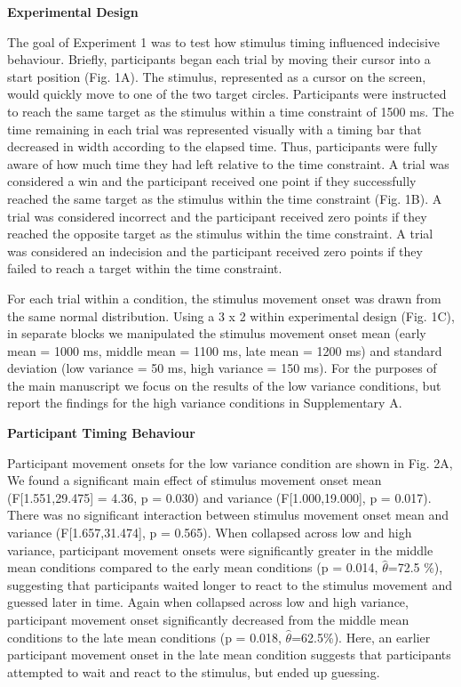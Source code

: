 \documentclass[12pt,letterpaper]{article}
\begin{document}
\noindent\textbf{\textcolor{mydarkblue}{{Experimental Design}}}
\vspace{2mm}

The goal of Experiment 1 was to test how stimulus timing influenced indecisive behaviour. Briefly, participants began each trial by moving their cursor into a start position (Fig. 1A). The stimulus, represented as a cursor on the screen, would quickly move to one of the two target circles. Participants were instructed to reach the same target as the stimulus within a time constraint of 1500 ms. The time remaining in each trial was represented visually with a timing bar that decreased in width according to the elapsed time. Thus, participants were fully aware of how much time they had left relative to the time constraint. A trial was considered a win and the participant received one point if they successfully reached the same target as the stimulus within the time constraint (Fig. 1B). A trial was considered incorrect and the participant received zero points if they reached the opposite target as the stimulus within the time constraint. A trial was considered an indecision and the participant received zero points if they failed to reach a target within the time constraint.

For each trial within a condition, the stimulus movement onset was drawn from the same normal distribution. Using a 3 x 2 within experimental design (Fig. 1C), in separate blocks we manipulated the stimulus movement onset mean (early mean = 1000 ms, middle mean = 1100 ms, late mean = 1200 ms) and standard deviation (low variance = 50 ms, high variance = 150 ms). For the purposes of the main manuscript we focus on the results of the low variance conditions, but report the findings for the high variance conditions in Supplementary A.

\noindent\textbf{\textcolor{mydarkblue}{{Participant Timing Behaviour}}}
\vspace{2mm}

Participant movement onsets for the low variance condition are shown in Fig. 2A, We found a significant main effect of stimulus movement onset mean (F[1.551,29.475] = 4.36, p = 0.030) and variance (F[1.000,19.000], p = 0.017). There was no significant interaction between stimulus movement onset mean and variance (F[1.657,31.474], p = 0.565). When collapsed across low and high variance, participant movement onsets were significantly greater in the middle mean conditions compared to the early mean conditions (p = 0.014, $\hat{\theta}$=72.5 \%), suggesting that participants waited longer to react to the stimulus movement and guessed later in time. Again when collapsed across low and high variance, participant movement onset significantly decreased from the middle mean conditions to the late mean conditions (p = 0.018, $\hat{\theta}$=62.5\%). Here, an earlier participant movement onset in the late mean condition suggests that participants attempted to wait and react to the stimulus, but ended up guessing.
\end{document}
